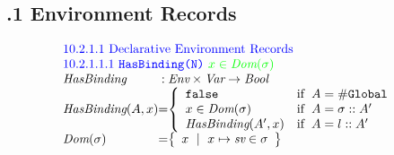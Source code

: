 \subsection*{.1 Environment Records}

\[
\begin{array}{l@{}c@{}l}
\multicolumn{3}{l}{\mbox{{\inblue 10.2.1.1 Declarative Environment Records}}}\\
\multicolumn{3}{l}{\mbox{\inblue 10.2.1.1.1 {\tt HasBinding(N)} {\ingreen$x\in\hf{Dom}(\er)$}}}\\
\hf{HasBinding} & :& \Env \times \Var \rightarrow \Bool \\
\hf{HasBinding}(A, x) &=&
\left\{\begin{array}{ll}
\false &\ifc{A = \lg}\\
x \in \hf{Dom}(\er) &\ifc{A = \mkst{\er}{A'}}\\
\hf{HasBinding}(A',x) &\ifc{A = \mkst{l}{A'}}\\
\end{array}
\right.
 \\[1em]
\hf{Dom}(\er) &=& \set{x\ \mid\ x\mapsto \emph{sv} \in \er} \\[1em]

\end{array}
\]


